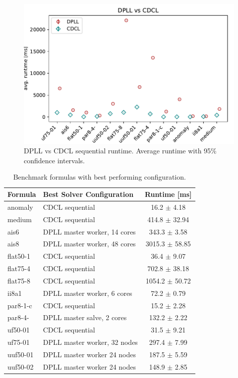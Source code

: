 \documentclass[letterpaper]{article}
\begin{document}
\begin{figure}[h]
    \centering
    \includegraphics[width=\columnwidth]{figures/dpll_vs_cdcl.pdf}
    \caption{DPLL vs CDCL sequential runtime. Average runtime with 95\% confidence intervals.}
    \label{fig:dpll_stealing_speedup_non}
\end{figure}

\begin{table}
    \centering
    \begin{tabular}{|l|l|c|}
        \hline
        Formula & Best Solver Configuration & Runtime [ms]\\
        \hline
        \hline
        anomaly & CDCL sequential & 16.2 $\pm$ 4.18 \\
        \hline
        medium & CDCL sequential & 414.8 $\pm$ 32.94 \\
        \hline
        ais6 & DPLL master worker, 14 cores & 343.3 $\pm$ 3.58 \\
        \hline
        ais8 & DPLL master worker, 48 cores & 3015.3 $\pm$ 58.85 \\
        \hline
        flat50-1 & CDCL sequential & 36.4 $\pm$ 9.07 \\
        \hline
        flat75-4 & CDCL sequential & 702.8 $\pm$ 38.18 \\
        \hline
        flat75-8 & CDCL sequential & 1054.2 $\pm$ 50.72 \\
        \hline
        ii8a1 & DPLL master worker, 6 cores & 72.2 $\pm$ 0.79 \\
        \hline
        par8-1-c & CDCL sequential & 15.2 $\pm$ 2.28 \\
        \hline
        par8-4- & DPLL master salve, 2 cores & 132.2 $\pm$ 2.22 \\
        \hline
        uf50-01 & CDCL sequential & 31.5 $\pm$ 9.21 \\
        \hline
        uf75-01 & DPLL master worker, 32 nodes & 297.4 $\pm$ 7.99 \\
        \hline
        uuf50-01 & DPLL master worker 24 nodes & 187.5 $\pm$ 5.59 \\
        \hline
        uuf50-02 & DPLL master worker 24 nodes & 148.9 $\pm$ 2.85 \\
        \hline
    \end{tabular}
    \caption{Benchmark formulas with best performing configuration.}
    \label{tab:cnfs_parallel}
\end{table}
\end{document}
